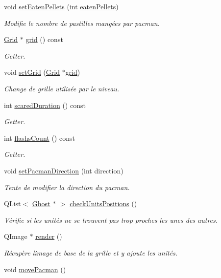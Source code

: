 \begin{DoxyCompactItemize}
void \hyperlink{class_level_af6c4d0af3e4e22bb2e543d03e39e68ac}{set\+Eaten\+Pellets} (int \hyperlink{class_level_a22e230e7ff4e40ae092534caafda9060}{eaten\+Pellets})
\begin{DoxyCompactList}\small\item\em Modifie le nombre de pastilles mangées par pacman. \end{DoxyCompactList}\item 
\hyperlink{class_grid}{Grid} $\ast$ \hyperlink{class_level_a61c34c5c6db8f96276fdb87ceaf3d879}{grid} () const 
\begin{DoxyCompactList}\small\item\em Getter. \end{DoxyCompactList}\item 
void \hyperlink{class_level_af43ddfbd5b7b08adc65cf88989280800}{set\+Grid} (\hyperlink{class_grid}{Grid} $\ast$\hyperlink{class_level_a61c34c5c6db8f96276fdb87ceaf3d879}{grid})
\begin{DoxyCompactList}\small\item\em Change de grille utilisée par le niveau. \end{DoxyCompactList}\item 
int \hyperlink{class_level_a870e37a0f1b58e8f0b7beb9819e8cc54}{scared\+Duration} () const 
\begin{DoxyCompactList}\small\item\em Getter. \end{DoxyCompactList}\item 
int \hyperlink{class_level_a002203a9fd3f9ea736af7e940602775c}{flashs\+Count} () const 
\begin{DoxyCompactList}\small\item\em Getter. \end{DoxyCompactList}\item 
void \hyperlink{class_level_a56e0184447f4469d5c13f08577b5c3f9}{set\+Pacman\+Direction} (int direction)
\begin{DoxyCompactList}\small\item\em Tente de modifier la direction du pacman. \end{DoxyCompactList}\item 
Q\+List$<$ \hyperlink{class_ghost}{Ghost} $\ast$ $>$ \hyperlink{class_level_a89da34148d40923b1a1448efd9e68486}{check\+Units\+Positions} ()
\begin{DoxyCompactList}\small\item\em Vérifie si les unités ne se trouvent pas trop proches les unes des autres. \end{DoxyCompactList}\item 
Q\+Image $\ast$ \hyperlink{class_level_a50346e8af1e9b6c6107a104ce70e962e}{render} ()
\begin{DoxyCompactList}\small\item\em Récupère l\textquotesingle{}image de base de la grille et y ajoute les unités. \end{DoxyCompactList}\item 
\hypertarget{class_level_ac61a6b945f5947beed35fea97495c719}{}void \hyperlink{class_level_ac61a6b945f5947beed35fea97495c719}{move\+Pacman} ()\label{class_level_ac61a6b945f5947beed35fea97495c719}


\end{DoxyCompactItemize}
